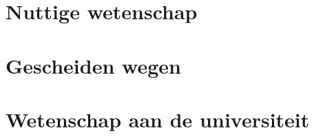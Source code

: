 \documentclass{article}
\begin{document}
  \newpage
  \section{Nuttige wetenschap}

  \newpage
  \section{Gescheiden wegen}

  \newpage
  \section{Wetenschap aan de universiteit}
\end{document}

